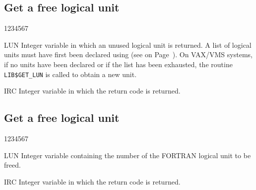 \subsection{Get a free logical unit}
\begin{DLtt}{1234567}
\item[LUN]
Integer variable in which an unused logical unit is returned.
A list of logical units must have first been declared using
 (see on Page~\pageref{FMSETU}).
On VAX/VMS systems, if no units have been declared or if the
list has been exhausted, the routine {\tt LIB\$GET\_LUN} is called
to obtain a new unit.
\item[IRC]
Integer variable in which the return code is returned.
\end{DLtt}
\subsection{Get a free logical unit}
\begin{DLtt}{1234567}
\item[LUN]
Integer variable containing the number of the FORTRAN logical
unit to be freed.
\item[IRC]
Integer variable in which the return code is returned.
\end{DLtt}
